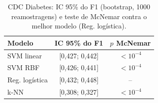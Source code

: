 \begin{table}[!t]
\centering
\caption{CDC Diabetes: IC 95\% do F1 (bootstrap, 1000 reamostragens) e teste de McNemar contra o melhor modelo (Reg. logística).}
\label{tab:cdc_sig}
\begin{tabular}{lcc}
\hline
Modelo & IC 95\% do F1 & $p$ McNemar \\
\hline
SVM linear & [0,427; 0,442] & $<10^{-4}$ \\
SVM RBF & [0,426; 0,441] & $<10^{-4}$ \\
Reg. logística & [0,432; 0,448] & -- \\
k-NN & [0,308; 0,327] & $<10^{-4}$ \\
\hline
\end{tabular}
\end{table}
